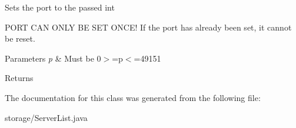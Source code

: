 \label{classstorage_1_1_server_list_1_1_server_data_a64d011f6e3dfeaa6c692df4dfb2e9691}
\-Sets the port to the passed int\par
 \par
 \-P\-O\-R\-T \-C\-A\-N \-O\-N\-L\-Y \-B\-E \-S\-E\-T \-O\-N\-C\-E! \-If the port has already been set, it cannot be reset. 
\begin{DoxyParams}{\-Parameters}
{\em p} & \-Must be 0$>$=p$<$=49151 \\
\hline
\end{DoxyParams}
\begin{DoxyReturn}{\-Returns}

\end{DoxyReturn}


\-The documentation for this class was generated from the following file\-:\begin{DoxyCompactItemize}
\item 
storage/\-Server\-List.\-java\end{DoxyCompactItemize}
